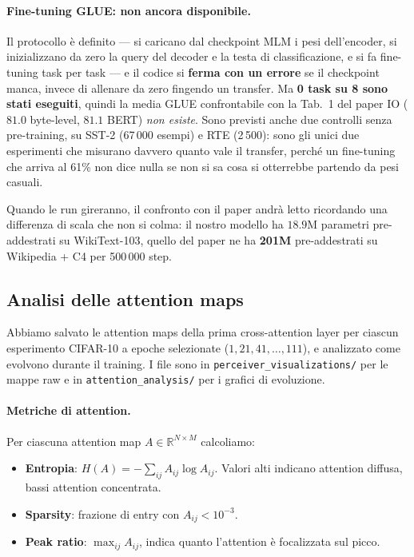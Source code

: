 \documentclass[
  11pt,
]{article}
\begin{document}
\paragraph{Fine-tuning GLUE: non ancora disponibile.} Il protocollo è definito --- si caricano dal checkpoint MLM i pesi dell'encoder, si inizializzano da zero la query del decoder e la testa di classificazione, e si fa fine-tuning task per task --- e il codice si \textbf{ferma con un errore} se il checkpoint manca, invece di allenare da zero fingendo un transfer. Ma \textbf{0 task su 8 sono stati eseguiti}, quindi la media GLUE confrontabile con la Tab.~1 del paper IO ($81.0$ byte-level, $81.1$ BERT) \emph{non esiste}. Sono previsti anche due controlli senza pre-training, su SST-2 (67\,000 esempi) e RTE (2\,500): sono gli unici due esperimenti che misurano davvero quanto vale il transfer, perché un fine-tuning che arriva al 61\% non dice nulla se non si sa cosa si otterrebbe partendo da pesi casuali.

Quando le run gireranno, il confronto con il paper andrà letto ricordando una differenza di scala che non si colma: il nostro modello ha $18.9$M parametri pre-addestrati su WikiText-103, quello del paper ne ha \textbf{201M} pre-addestrati su Wikipedia + C4 per 500\,000 step.

\subsection{Analisi delle attention maps}
\label{sec:progetto-attention}

Abbiamo salvato le attention maps della prima cross-attention layer per ciascun esperimento CIFAR-10 a epoche selezionate ($1, 21, 41, \ldots, 111$), e analizzato come evolvono durante il training. I file sono in \texttt{perceiver\_visualizations/} per le mappe raw e in \texttt{attention\_analysis/} per i grafici di evoluzione.

\paragraph{Metriche di attention.} Per ciascuna attention map $A \in \mathbb{R}^{N \times M}$ calcoliamo:
\begin{itemize}
\item \textbf{Entropia}: $H(A) = -\sum_{ij} A_{ij} \log A_{ij}$. Valori alti indicano attention diffusa, bassi attention concentrata.
\item \textbf{Sparsity}: frazione di entry con $A_{ij} < 10^{-3}$.
\item \textbf{Peak ratio}: $\max_{ij} A_{ij}$, indica quanto l'attention è focalizzata sul picco.
\end{itemize}
\end{document}

